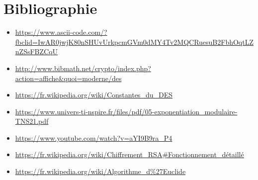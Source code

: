 \documentclass{article}
\begin{document}
\section{Bibliographie}
\begin{itemize}
    \item \url{https://www.ascii-code.com/?fbclid=IwAR0jwjK80nSHUvUrkpcmGVm0dMY4Tv2MQCRuesuB2FbhOqtLZnZSsFBZCqU}
    \item \url{http://www.bibmath.net/crypto/index.php?action=affiche&quoi=moderne/des}
    \item \url{https://fr.wikipedia.org/wiki/Constantes_du_DES}
    \item \url{https://www.univers-ti-nspire.fr/files/pdf/05-exponentiation_modulaire-TNS21.pdf}
    \item \url{https://www.youtube.com/watch?v=aYI9B9ra_P4}
    \item \url{https://fr.wikipedia.org/wiki/Chiffrement_RSA#Fonctionnement_détaillé}
    \item \url{https://fr.wikipedia.org/wiki/Algorithme_d%27Euclide}
\end{itemize}
\end{document}
